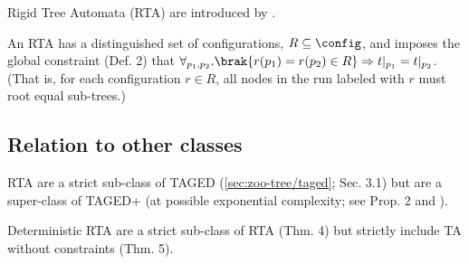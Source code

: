 Rigid Tree Automata (RTA) are introduced by \cite{jacquemard:rta}.

An RTA has a distinguished set of configurations, $R \subseteq \config$, and
imposes the global constraint (Def. 2) that $\forall_{p_1,p_2} . \brak{
r(p_1) = r(p_2) \in R } \Rightarrow t\vert_{p_1} = t\vert_{p_2}$.  (That is,
for each configuration $r \in R$, all nodes in the run labeled with $r$ must
root equal sub-trees.)


\subsection{Relation to other classes}
RTA are a strict sub-class of TAGED (\autoref{sec:zoo-tree/taged}; Sec. 3.1) but are a
super-class of TAGED+ (at possible exponential complexity; see Prop. 2 and
\cite{filiot:tagc}).


Deterministic RTA are a strict sub-class of RTA (Thm. 4) but strictly
include TA without constraints (Thm. 5).

